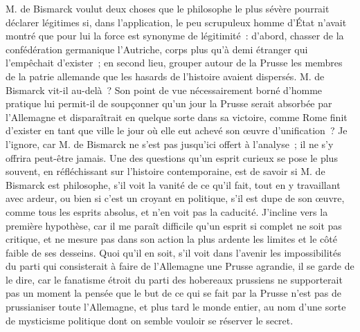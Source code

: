 \documentclass[french,twoside]{book} %
\begin{document}
M. de Bismarck voulut deux choses que le philosophe le plus sévère pourrait déclarer légitimes si, dans l’application, le peu scrupuleux homme d’État n’avait montré que pour lui la force est synonyme de légitimité : d’abord, chasser de la confédération germanique l’Autriche, corps plus qu’à demi étranger qui l’empêchait d’exister ; en second lieu, grouper autour de la Prusse les membres de la patrie allemande que les hasards de l’histoire avaient dispersés. M. de Bismarck vit-il au-delà ? Son point de vue nécessairement borné d’homme pratique lui permit-il de soupçonner qu’un jour la Prusse serait absorbée par l’Allemagne et disparaîtrait en quelque sorte dans sa victoire, comme Rome finit d’exister en tant que ville le jour où elle eut achevé son œuvre d’unification ? Je l’ignore, car M. de Bismarck ne s’est pas jusqu’ici offert à l’analyse ; il ne s’y offrira peut-être jamais. Une des questions qu’un esprit curieux se pose le plus souvent, en réfléchissant sur l’histoire contemporaine, est de savoir si M. de Bismarck est philosophe, s’il voit la vanité de ce qu’il fait, tout en y travaillant avec ardeur, ou bien si c’est un croyant en politique, s’il est dupe de son œuvre, comme tous les esprits absolus, et n’en voit pas la caducité. J’incline vers la première hypothèse, car il me paraît difficile qu’un esprit si complet ne soit pas critique, et ne mesure pas dans son action la plus ardente les limites et le côté faible de ses desseins. Quoi qu’il en soit, s’il voit dans l’avenir les impossibilités du parti qui consisterait à faire de l’Allemagne une Prusse agrandie, il se garde de le dire, car le fanatisme étroit du parti des hobereaux prussiens ne supporterait pas un moment la pensée que le but de ce qui se fait par la Prusse n’est pas de prussianiser toute l’Allemagne, et plus tard le monde entier, au nom d’une sorte de mysticisme politique dont on semble vouloir se réserver le secret.\par
\end{document}
